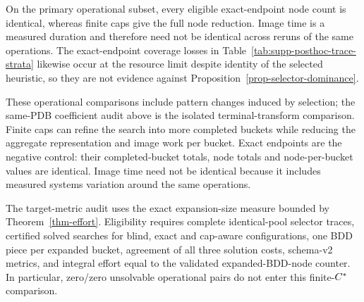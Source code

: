On the primary operational subset, every eligible exact-endpoint node count is
identical, whereas finite caps give the full node reduction. Image
time is a measured duration and therefore need not be identical across reruns
of the same operations. The exact-endpoint coverage losses in
Table~\ref{tab:supp-posthoc-trace-strata} likewise occur at the resource limit
despite identity of the selected heuristic, so they are not evidence against
Proposition~\ref{prop-selector-dominance}.

\begin{table}[htbp]
  \centering
  \caption{Post-hoc conservation across completed buckets. ``Pos./zero''
    splits pairs by whether the bucket denominator is positive or zero in both
    configurations. Bucket, node/bucket and image/bucket ratios are cap-aware
    over exact; the last columns give taskwise L/E/H signs for the normalized
    metrics on positive-denominator pairs.}
  \label{tab:supp-posthoc-per-bucket}
\end{table}

These operational comparisons include pattern changes induced by selection;
the same-PDB coefficient audit above is the isolated terminal-transform
comparison. Finite caps can refine the search into more completed buckets while
reducing the aggregate representation and image work per bucket. Exact
endpoints are the negative control: their completed-bucket totals, node totals
and node-per-bucket values are identical. Image time need not be identical
because it includes measured systems variation around the same operations.

The target-metric audit uses the exact expansion-size measure bounded by
Theorem~\ref{thm-effort}. Eligibility requires complete identical-pool selector traces,
certified solved searches for blind, exact and cap-aware configurations, one
BDD piece per expanded bucket, agreement of all three solution costs,
schema-v2 metrics, and
integral effort equal to the validated expanded-BDD-node counter. In
particular, zero/zero unsolvable operational pairs do not enter this
finite-$C^{*}$ comparison.

